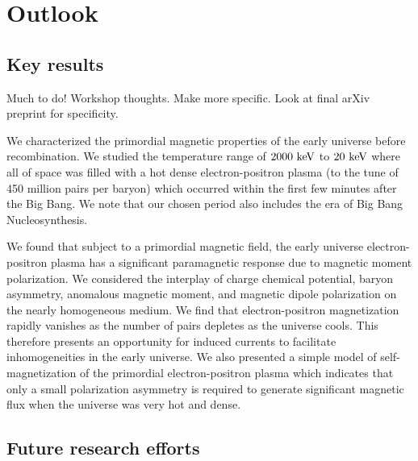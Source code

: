 \chapter{Outlook}
\label{chap:outlook}

\section{Key results}
\label{sec:results}
{\xred Much to do! Workshop thoughts. Make more specific. Look at final arXiv preprint for specificity.}

We characterized the primordial magnetic properties of the early universe before recombination. We studied the temperature range of $2000\text{ keV}$ to $20\text{ keV}$ where all of space was filled with a hot dense electron-positron plasma (to the tune of 450 million pairs per baryon) which occurred within the first few minutes after the Big Bang. We note that our chosen period also includes the era of Big Bang Nucleosynthesis.

We found that subject to a primordial magnetic field, the early universe electron-positron plasma has a significant paramagnetic response due to magnetic moment polarization. We considered the interplay of charge chemical potential, baryon asymmetry, anomalous magnetic moment, and magnetic dipole polarization on the nearly homogeneous medium. We find that electron-positron magnetization rapidly vanishes as the number of pairs depletes as the universe cools. This therefore presents an opportunity for induced currents to facilitate inhomogeneities in the early universe. We also presented a simple model of self-magnetization of the primordial electron-positron plasma which indicates that only a small polarization asymmetry is required to generate significant magnetic flux when the universe was very hot and dense.
\section{Future research efforts}
\label{sec:future}
